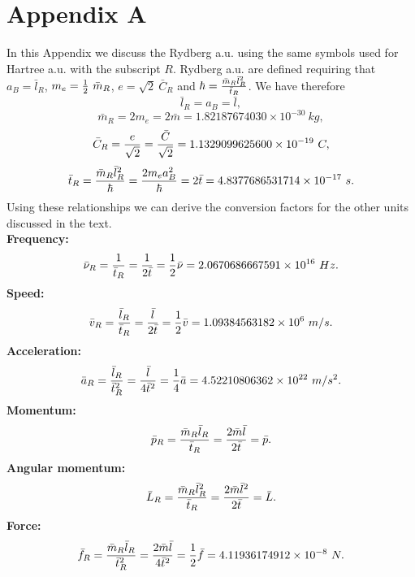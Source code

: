 \documentclass[12pt,a4paper]{article}
\def\barmry{1.82187674030\times 10^{-30}}
\def\bartry{4.8377686531714\times 10^{-17}}
\def\barnury{2.0670686667591\times 10^{16}}
\def\barvry{1.09384563182\times 10^{6}}
\def\barary{4.52210806362\times 10^{22}}
\def\barfry{4.11936174912\times 10^{-8}}
\def\barcry{1.1329099625600\times 10^{-19}}
\begin{document}
\section{\color{coral} Appendix A}
{\color{violet}
In this Appendix we discuss the Rydberg a.u. using the same 
symbols used for Hartree a.u. with the subscript $R$.
Rydberg a.u. are defined requiring that
$a_B=\bar l_R$, $m_e={1\over 2}\ \bar m_R$, $e=\sqrt{2}\ \bar C_R$ and 
$\hbar= {\bar m_R \bar l_R^2 \over \bar t_R}$.
We have therefore 
\begin{equation}
\bar l_R=a_B=\bar l,
\end{equation}
\begin{equation}
\bar m_R=2 m_e=2 \bar m=\barmry\ kg,
\end{equation}
\begin{equation}
\bar C_R={e \over \sqrt{2}}= {\bar C \over \sqrt{2}}=\barcry\ C,
\end{equation}
\begin{equation}
\bar t_R={\bar m_R \bar l_R^2 \over \hbar}= {2 m_e a_B^2 \over \hbar}=
2 \bar t=\bartry\ s.
\end{equation}
Using these relationships we can derive the conversion factors for
the other units discussed in the text. \\
{\bf Frequency:}
\begin{equation}
\bar \nu_R={1\over \bar t_R}= {1\over 2 \bar t}= {1\over 2}\bar \nu=
\barnury\ Hz.
\end{equation}
{\bf Speed:}
\begin{equation}
\bar v_R={\bar l_R\over \bar t_R}= {\bar l\over 2 \bar t}= {1\over 2}\bar v=
\barvry\ m/s.
\end{equation}
{\bf Acceleration:}
\begin{equation}
\bar a_R={\bar l_R\over \bar t_R^2}= {\bar l\over 4 \bar t^2}=
{1\over 4}\bar a=\barary\ m/s^2.
\end{equation}
{\bf Momentum:}
\begin{equation}
\bar p_R={\bar m_R \bar l_R\over \bar t_R}= {2 \bar m \bar l\over 2 \bar t}= 
\bar p.
\end{equation}
{\bf Angular momentum:}
\begin{equation}
\bar L_R={\bar m_R \bar l_R^2\over \bar t_R}= {2 \bar m \bar l^2\over 2 
\bar t}= \bar L.
\end{equation}
{\bf Force:}
\begin{equation}
\bar f_R={\bar m_R \bar l_R\over \bar t_R^2}= {2 \bar m \bar l\over 4 
\bar t^2}= {1\over 2} \bar f=\barfry\ N.
\end{equation}
}
\end{document}
